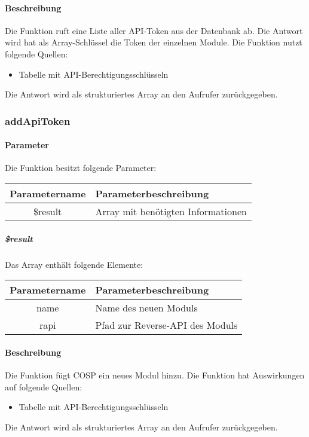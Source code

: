 \paragraph{Beschreibung} Die Funktion ruft eine Liste aller API-Token aus der Datenbank ab. Die Antwort wird hat als Array-Schlüssel die Token der einzelnen Module. Die Funktion nutzt folgende Quellen:
\begin{itemize}
	\item Tabelle mit API-Berechtigungsschlüsseln
\end{itemize}
Die Antwort wird als strukturiertes Array an den Aufrufer zurückgegeben.
\subsubsection{addApiToken}
\paragraph{Parameter} Die Funktion besitzt folgende Parameter:
\begin{table}[H]
	\begin{tabular}{|c|p{11cm}|}
		\hline
		\textbf{Parametername} & \textbf{Parameterbeschreibung} \\ \hline
		\$result & Array mit benötigten Informationen \\ \hline
	\end{tabular}
\end{table}
\subparagraph{\$result}Das Array enthält folgende Elemente:
\begin{table}[H]
	\begin{tabular}{|c|p{11cm}|}
		\hline
		\textbf{Parametername} & \textbf{Parameterbeschreibung} \\ \hline
		name & Name des neuen Moduls \\ \hline
		rapi & Pfad zur Reverse-API des Moduls \\ \hline
	\end{tabular}
\end{table}
\paragraph{Beschreibung} Die Funktion fügt {\glqq COSP\grqq} ein neues Modul hinzu. Die Funktion hat Auswirkungen auf folgende Quellen:
\begin{itemize}
	\item Tabelle mit API-Berechtigungsschlüsseln
\end{itemize}
Die Antwort wird als strukturiertes Array an den Aufrufer zurückgegeben.
